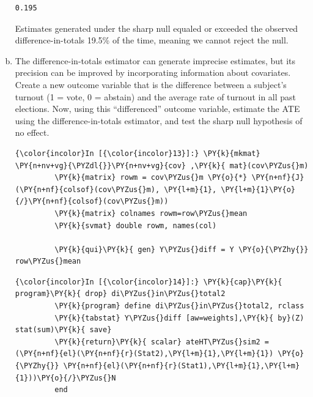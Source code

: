 \documentclass[11pt,notitlepage]{article}\usepackage[]{graphicx}\usepackage[]{color}
\makeatletter
\newenvironment{kframe}{%
 \def\at@end@of@kframe{}%
 \ifinner\ifhmode%
  \def\at@end@of@kframe{\end{minipage}}%
  \begin{minipage}{\columnwidth}%
 \fi\fi%
 \def\FrameCommand##1{\hskip\@totalleftmargin \hskip-\fboxsep
 \colorbox{shadecolor}{##1}\hskip-\fboxsep
     \hskip-\linewidth \hskip-\@totalleftmargin \hskip\columnwidth}%
 \MakeFramed {\advance\hsize-\width
   \@totalleftmargin\z@ \linewidth\hsize
   \@setminipage}}%
 {\par\unskip\endMakeFramed%
 \at@end@of@kframe}
\newenvironment{knitrout}{}{} %
\makeatother
\begin{document}
\begin{enumerate}[a)]
\begin{knitrout}
\begin{kframe}
    \begin{Verbatim}[commandchars=\\\{\}]
   0.195

    \end{Verbatim}
\end{kframe}
\end{knitrout}

Estimates generated under the sharp null equaled or exceeded the observed difference-in-totals 19.5\% of the time, meaning we cannot reject the null.

\item The difference-in-totals estimator can generate imprecise estimates, but its precision can be improved by incorporating information about covariates. Create a new outcome variable that is the difference between a subject's turnout (1 = vote, 0 = abstain) and the average rate of turnout in all past elections. Now, using this ``differenced'' outcome variable, estimate the ATE using the difference-in-totals estimator, and test the sharp null hypothesis of no effect.

\begin{knitrout}
\color{fgcolor}\begin{kframe}
   \begin{Verbatim}[commandchars=\\\{\}]
{\color{incolor}In [{\color{incolor}13}]:} \PY{k}{mkmat} \PY{n+nv+vg}{\PYZdl{}}\PY{n+nv+vg}{cov} ,\PY{k}{ mat}(cov\PYZus{}m)
         \PY{k}{matrix} rowm = cov\PYZus{}m \PY{o}{*} \PY{n+nf}{J}(\PY{n+nf}{colsof}(cov\PYZus{}m), \PY{l+m}{1}, \PY{l+m}{1}\PY{o}{/}\PY{n+nf}{colsof}(cov\PYZus{}m))
         \PY{k}{matrix} colnames rowm=row\PYZus{}mean
         \PY{k}{svmat} double rowm, names(col)
         
         \PY{k}{qui}\PY{k}{ gen} Y\PYZus{}diff = Y \PY{o}{\PYZhy{}} row\PYZus{}mean
\end{Verbatim}

    \begin{Verbatim}[commandchars=\\\{\}]
{\color{incolor}In [{\color{incolor}14}]:} \PY{k}{cap}\PY{k}{ program}\PY{k}{ drop} di\PYZus{}in\PYZus{}total2
         \PY{k}{program} define di\PYZus{}in\PYZus{}total2, rclass
         \PY{k}{tabstat} Y\PYZus{}diff [aw=weights],\PY{k}{ by}(Z)  stat(sum)\PY{k}{ save}
         \PY{k}{return}\PY{k}{ scalar} ateHT\PYZus{}sim2 = (\PY{n+nf}{el}(\PY{n+nf}{r}(Stat2),\PY{l+m}{1},\PY{l+m}{1}) \PY{o}{\PYZhy{}} \PY{n+nf}{el}(\PY{n+nf}{r}(Stat1),\PY{l+m}{1},\PY{l+m}{1}))\PY{o}{/}\PYZus{}N
         end
         

\end{Verbatim}
\end{kframe}
\end{knitrout}
\end{enumerate}
\end{document}
